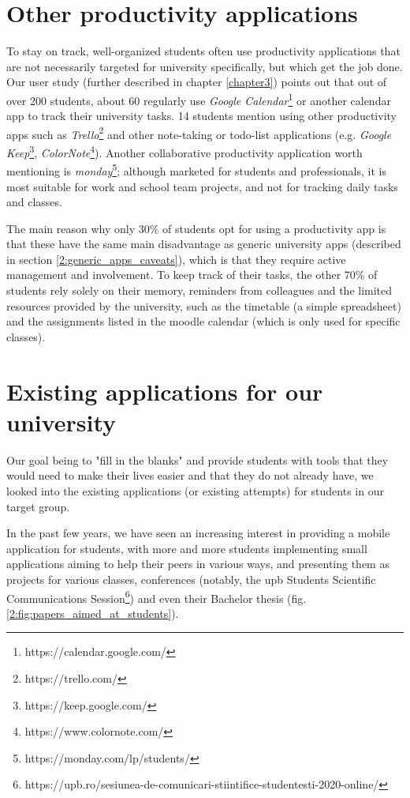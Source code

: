 \section{Other productivity applications} \label{2:other_apps}
    To stay on track, well-organized students often use productivity applications that are not necessarily targeted for university specifically, but which get the job done. Our user study (further described in chapter \ref{chapter3}) points out that out of over 200 students, about 60 regularly use \textit{Google Calendar}\footnote{https://calendar.google.com/} or another calendar app to track their university tasks. 14 students mention using other productivity apps such as \textit{Trello}\footnote{https://trello.com/} and other note-taking or todo-list applications (e.g. \textit{Google Keep}\footnote{https://keep.google.com/}, \textit{ColorNote}\footnote{https://www.colornote.com/}). Another collaborative productivity application worth mentioning is \textit{monday}\footnote{https://monday.com/lp/students/}; although marketed for students and professionals, it is most suitable for work and school team projects, and not for tracking daily tasks and classes.
    
    The main reason why only 30\% of students opt for using a productivity app is that these have the same main disadvantage as generic university apps (described in section \ref{2:generic_apps_caveats}), which is that they require active management and involvement. To keep track of their tasks, the other 70\% of students rely solely on their memory, reminders from colleagues and the limited resources provided by the university, such as the timetable (a simple spreadsheet) and the assignments listed in the \gls{moodle} calendar (which is only used for specific classes).

\section{Existing applications for our university} \label{2:existing_apps}
    Our goal being to "fill in the blanks" and provide students with tools that they would need to make their lives easier and that they do not already have, we looked into the existing applications (or existing attempts) for students in our target group.
    
    In the past few years, we have seen an increasing interest in providing a mobile application for students, with more and more students implementing small applications aiming to help their peers in various ways, and presenting them as projects for various classes, conferences (notably, the \acrshort{upb} Students Scientific Communications Session\footnote{https://upb.ro/sesiunea-de-comunicari-stiintifice-studentesti-2020-online/}) and even their Bachelor thesis (fig. \ref{2:fig:papers_aimed_at_students}).
    
